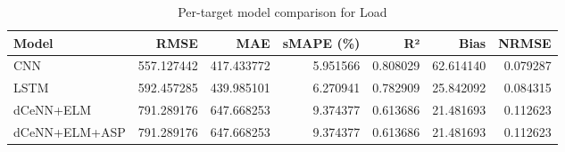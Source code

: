 \begin{table}
\caption{Per-target model comparison for Load}
\begin{tabular}{lrrrrrr}
\toprule
Model & RMSE & MAE & sMAPE (\%) & R² & Bias & NRMSE \\
\midrule
CNN & 557.127442 & 417.433772 & 5.951566 & 0.808029 & 62.614140 & 0.079287 \\
LSTM & 592.457285 & 439.985101 & 6.270941 & 0.782909 & 25.842092 & 0.084315 \\
dCeNN+ELM & 791.289176 & 647.668253 & 9.374377 & 0.613686 & 21.481693 & 0.112623 \\
dCeNN+ELM+ASP & 791.289176 & 647.668253 & 9.374377 & 0.613686 & 21.481693 & 0.112623 \\
\bottomrule
\end{tabular}
\end{table}
